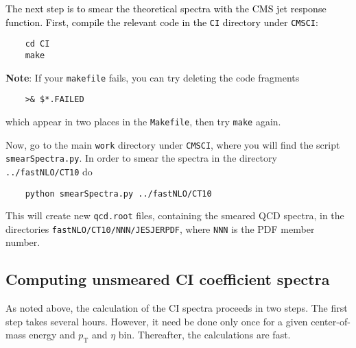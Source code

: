 \documentclass[aps,prd,preprint,nofootinbib]{revtex4}
\begin{document}
\textcolor{black}{
The next step is to smear the theoretical spectra with the CMS jet response function. 
First, compile the relevant code in the {\tt CI} directory under {\tt CMSCI}:}
	\begin{verbatim}
	cd CI
	make
	\end{verbatim}
{\bf Note}: If your {\tt makefile} fails, you can try deleting the code fragments 
	\begin{verbatim}
	>& $*.FAILED
	\end{verbatim}
which appear in two places in the {\tt Makefile}, then try {\tt make} again.

Now, go to the main {\tt work} directory under {\tt CMSCI}, where you will find the script
{\tt smearSpectra.py}. In order to smear the spectra in the directory {\tt ../fastNLO/CT10} do
	\begin{verbatim}
	python smearSpectra.py ../fastNLO/CT10
	\end{verbatim}

This will create new {\tt qcd.root} files, containing the smeared QCD spectra, in the directories
{\tt fastNLO/CT10/NNN/JESJERPDF}, where {\tt NNN} is the PDF member number.

\subsection{Computing unsmeared CI coefficient spectra}

As noted above, the calculation of the CI spectra proceeds in two steps. The first step takes several
hours. However, it need be done only once for a given center-of-mass energy and  $p_\text{T}$
and $\eta$ bin. Thereafter, the calculations are fast.
\end{document}
